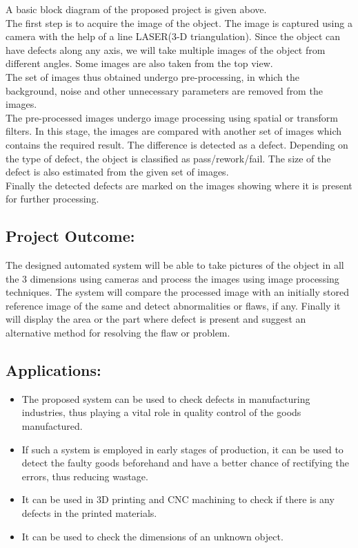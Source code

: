 \documentclass[12pt]{article}
\begin{document}
A basic block diagram of the proposed project is given above.\\
\null{\quad}The first step is to acquire the image of the object. The image is captured using a camera with the help of a line LASER(3-D triangulation). Since the object can have defects along any axis, we will take multiple images of the object from different angles. Some images are also taken from the top view.\\
\null{\quad}The set of images thus obtained undergo pre-processing, in which the background, noise and other unnecessary parameters are removed from the images.\\
\null{\quad}The pre-processed images undergo image processing using spatial or transform filters. In this stage, the images are compared with another set of images which contains the required result. The difference is detected as a defect. Depending on the type of defect, the object is classified as pass/rework/fail. The size of the defect is also estimated from the given set of images.\\
\null{\quad}Finally the detected defects are marked on the images showing where it is present for further processing.

\subsection{Project Outcome:}
{\quad}The designed automated system will be able to take pictures of the object in all the 3 dimensions using cameras and process the images using image processing techniques. The system will compare the processed image with an initially stored reference image of the same and detect abnormalities or flaws, if any. Finally it will display the area or the part where defect is present and suggest an alternative method for resolving the flaw or problem. 

\subsection{Applications:}
\begin{itemize}
\item{
The proposed system can be used to check defects in manufacturing industries, thus playing a vital role in quality control of the goods manufactured.
}
\item{
If such a system is employed in early stages of production, it can be used to detect the faulty goods beforehand and have a better chance of rectifying the errors, thus reducing wastage.
}
\item{
It can be used in 3D printing and CNC machining to check if there is any defects in the printed materials.
}
\item{
It can be used to check the dimensions of an unknown object.
}

\end{itemize}
\newpage
\end{document}
